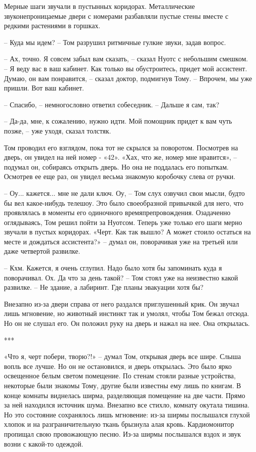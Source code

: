 Мерные шаги звучали в пустынных коридорах. Металлические звуконепроницаемые двери с номерами разбавляли пустые стены вместе с редкими растениями в горшках. 

– Куда мы идем? – Том разрушил ритмичные гулкие звуки, задав вопрос.

– Ах, точно. Я совсем забыл вам сказать, – сказал Нуотс с небольшим смешком. – Я веду вас в ваш кабинет. Как только вы обустроитесь, придет мой ассистент. Думаю, он вам понравится, – сказал доктор, подмигнув Тому. – Впрочем, мы уже пришли. Вот ваш кабинет.

– Спасибо, – немногословно ответил собеседник. – Дальше я сам, так?

– Да-да, мне, к сожалению, нужно идти. Мой помощник придет к вам чуть позже, – уже уходя, сказал толстяк. 

Том проводил его взглядом, пока тот не скрылся за поворотом. Посмотрев на дверь, он увидел на ней номер - «42». «Хах, что же, номер мне нравится», – подумал он, собираясь открыть дверь. Но она не поддалась его попыткам. Осмотрев ее еще раз, он увидел весьма знакомую коробочку слева от ручки. 

– Оу... кажется... мне не дали ключ. Оу, – Том слух озвучил свои мысли, будто бы вел какое-нибудь телешоу. Это было своеобразной привычкой для него, что проявлялась в моменты его одиночного времяпрепровождения. Озадаченно оглядываясь, Том решил пойти за Нуотсом. Теперь уже только его шаги мерно звучали в пустых коридорах. «Черт. Как так вышло? А может стоило остаться на месте и дождаться ассистента?» – думал он, поворачивая уже на третьей или даже четвертой развилке. 

– Кхм. Кажется, я очень сглупил. Надо было хотя бы запоминать куда я поворачивал. Ох. Да что за день такой? – Том стоял уже на неизвестно какой развилке. – Не здание, а лабиринт. Где планы эвакуации хотя бы?

Внезапно из-за двери справа от него раздался приглушенный крик. Он звучал лишь мгновение, но животный инстинкт так и умолял, чтобы Том бежал отсюда. Но он не слушал его. Он положил руку на дверь и нажал на нее. Она открылась.

\begin{center}***\end{center}

«Что я, черт побери, творю?!» – думал Том, открывая дверь все шире. Слыша вопль все лучше. Но он не остановился, и дверь открылась. Это было ярко освещенное белым светом помещение. По стенам стояли разные устройства, некоторые были знакомы Тому, другие были известны ему лишь по книгам.  В конце комнаты виднелась ширма, разделяющая помещение на две части. Прямо за ней находился источник шума. Внезапно все стихло, комнату окутала тишина. Но это состояние сохранялось лишь мгновение: из-за ширмы послышался глухой хлопок и на разграничительную ткань брызнула алая кровь. Кардиомонитор пропищал свою провожающую песню. Из-за ширмы послышался вздох и звук возни с какой-то одеждой.

